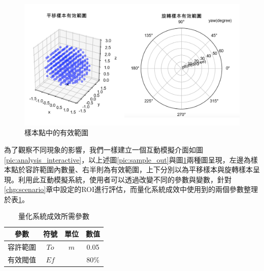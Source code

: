 \begin{figure}[htpb]
    \centering
    \includegraphics[width=14cm]{ch4pic/effective.png}
    \caption{樣本點中的有效範圍}
    \label{pic:effective}
\end{figure}





為了觀察不同現象的影響，我們一樣建立一個互動模擬介面如圖\ref{pic:analysis_interactive}，以上述圖\ref{pic:sample_out}與圖\ref{pic:effective}兩種圖呈現，左邊為樣本點於容許範圍內數量、右半則為有效範圍，上下分別以為平移樣本與旋轉樣本呈現。利用此互動模擬系統，使用者可以透過改變不同的參數與變數，針對\ref{chp:scenario}章中設定的ROI進行評估，而量化系統成效中使用到的兩個參數整理於表\ref{tab:para_evaluate}。

\begin{table}[htpb]
    \begin{center}
      \caption{量化系統成效所需參數}
      \label{tab:para_evaluate}
      \begin{tabular}{c|c|c|c} %
        \textbf{參數} & \textbf{符號}&\textbf{單位}&\textbf{數值}\\
       \hline
       容許範圍 & $To$ &$m$& 0.05 \\
       有效閥值 & $Ef$ && $80\%$\\
     \end{tabular}
   \end{center}
 \end{table}

